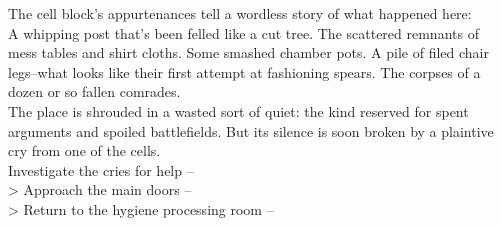 The cell block’s appurtenances tell a wordless story of what happened here:\\

A whipping post that’s been felled like a cut tree. The scattered remnants of mess tables and shirt cloths. Some smashed chamber pots. A pile of filed chair legs--what looks like their first attempt at fashioning spears. The corpses of a dozen or so fallen comrades.\\

The place is shrouded in a wasted sort of quiet: the kind reserved for spent arguments and spoiled battlefields. But its silence is soon broken by a plaintive cry from one of the cells.\\

 Investigate the cries for help -- \\
> Approach the main doors -- \\
> Return to the hygiene processing room -- 